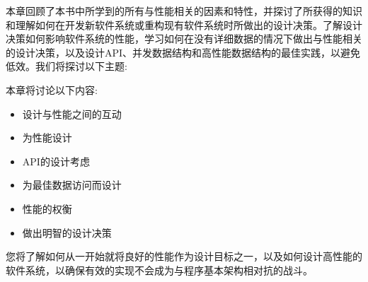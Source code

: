 本章回顾了本书中所学到的所有与性能相关的因素和特性，并探讨了所获得的知识和理解如何在开发新软件系统或重构现有软件系统时所做出的设计决策。了解设计决策如何影响软件系统的性能，学习如何在没有详细数据的情况下做出与性能相关的设计决策，以及设计API、并发数据结构和高性能数据结构的最佳实践，以避免低效。我们将探讨以下主题:

本章将讨论以下内容:

\begin{itemize}
\item 
设计与性能之间的互动

\item 
为性能设计

\item 
API的设计考虑

\item 
为最佳数据访问而设计

\item 
性能的权衡

\item 
做出明智的设计决策
\end{itemize}

您将了解如何从一开始就将良好的性能作为设计目标之一，以及如何设计高性能的软件系统，以确保有效的实现不会成为与程序基本架构相对抗的战斗。